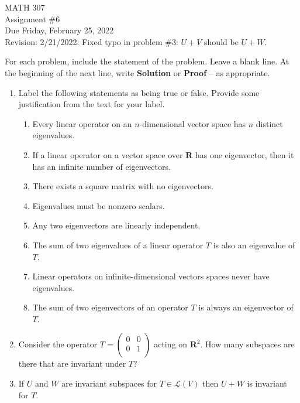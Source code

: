 \documentclass[12pt]{article}
\begin{document}

\noindent MATH 307 \\
Assignment \#6 \\   %
Due Friday, February 25, 2022 \\
Revision: 2/21/2022:  Fixed typo in problem \#3:  $U+V$ should be $U+W$.

For each problem, include the statement of the problem. Leave a blank line.  At the beginning of the next line, write \textbf{Solution} or \textbf{Proof} -- as appropriate.

\begin{enumerate}
\item Label the following statements as being true or false.
Provide some justification from the text for your label.
    \begin{enumerate}
        \item Every linear operator on an $n$-dimensional vector space has $n$ distinct eigenvalues.
        \item If a linear operator on a vector space over $\mathbf{R}$ has one eigenvector, then it has an infinite number of eigenvectors.
        \item There exists a square matrix with no eigenvectors.
        \item Eigenvalues must be nonzero scalars.
        \item Any two eigenvectors are linearly independent.
        \item The sum of two eigenvalues of a linear operator $T$ is also an eigenvalue of $T$.
        \item Linear operators on infinite-dimensional vectors spaces never have eigenvalues.
        \item The sum of two eigenvectors of an operator $T$ is always an eigenvector of $T$.
    \end{enumerate}

\item Consider the operator
        $T = \left(
               \begin{array}{cc}
                 0 & 0  \\
                 0 & 1 \\
               \end{array}
             \right)$
        acting on $\mathbf{R}^2$.  How many subspaces are there that are invariant under $T$?

\item If $U$ and $W$ are invariant subspaces for $T \in \mathcal{L}(V)$ then $U+W$ is invariant for $T$.


\end{enumerate}
\end{document}
